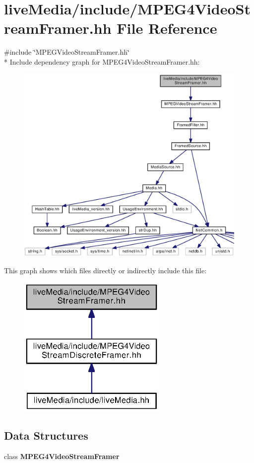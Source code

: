 \section{live\+Media/include/\+M\+P\+E\+G4\+Video\+Stream\+Framer.hh File Reference}
\label{MPEG4VideoStreamFramer_8hh}
{\ttfamily \#include \char`\"{}M\+P\+E\+G\+Video\+Stream\+Framer.\+hh\char`\"{}}\\*
Include dependency graph for M\+P\+E\+G4\+Video\+Stream\+Framer.\+hh\+:
\nopagebreak
\begin{figure}[H]
\begin{center}
\leavevmode
\includegraphics[width=350pt]{MPEG4VideoStreamFramer_8hh__incl}
\end{center}
\end{figure}
This graph shows which files directly or indirectly include this file\+:
\nopagebreak
\begin{figure}[H]
\begin{center}
\leavevmode
\includegraphics[width=205pt]{MPEG4VideoStreamFramer_8hh__dep__incl}
\end{center}
\end{figure}
\subsection*{Data Structures}
\begin{DoxyCompactItemize}
\item 
class {\bf M\+P\+E\+G4\+Video\+Stream\+Framer}
\end{DoxyCompactItemize}
